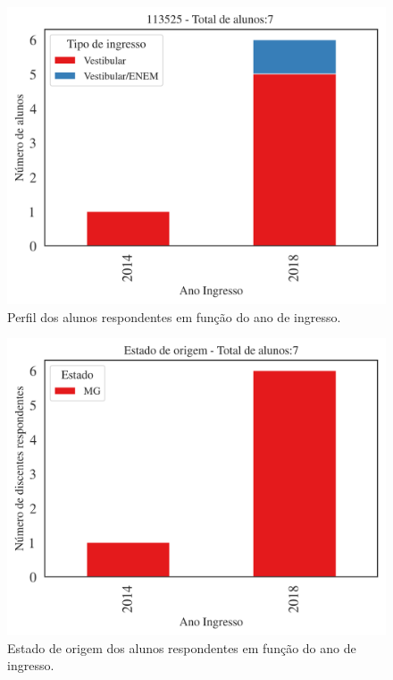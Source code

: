 \documentclass[a4paper,10pt]{article}
\begin{document}
\begin{figure}[h]
\centering
\includegraphics[width=0.99\linewidth]{ingresso_discentes_curso_tipo_113525}
\caption{\label{fig:ingressoano} Perfil  dos alunos respondentes  em função do ano de ingresso.}
\end{figure}

\begin{figure}[h]
\centering
\includegraphics[width=0.99\linewidth]{quantitativos_estado_de_origem_113525}
\caption{\label{fig:estadoano} Estado de origem dos alunos respondentes em função do ano de ingresso.}
\end{figure}
\end{document}
